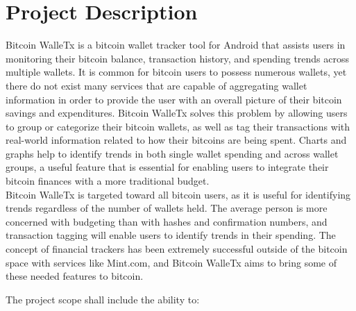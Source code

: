 \documentclass[12pt]{article}
\begin{document}
  \section{Project Description}
  \begin{adjustwidth}{1.5em}{0pt}

  \normalsize{Bitcoin WalleTx is a bitcoin wallet tracker tool for Android that assists users in monitoring their bitcoin balance, transaction history, and spending trends across multiple wallets. It is common for bitcoin users to possess numerous wallets, yet there do not exist many services that are capable of aggregating wallet information in order to provide the user with an overall picture of their bitcoin savings and expenditures. Bitcoin WalleTx solves this problem by allowing users to group or categorize their bitcoin wallets, as well as tag their transactions with real-world information related to how their bitcoins are being spent. Charts and graphs help to identify trends in both single wallet spending and across wallet groups, a useful feature that is essential for enabling users to integrate their bitcoin finances with a more traditional budget.}\\

  \normalsize{Bitcoin WalleTx is targeted toward all bitcoin users, as it is useful for identifying trends regardless of the number of wallets held. The average person is more concerned with budgeting than with hashes and confirmation numbers, and transaction tagging will enable users to identify trends in their spending. The concept of financial trackers has been extremely successful outside of the bitcoin space with services like Mint.com, and Bitcoin WalleTx aims to bring some of these needed features to bitcoin.}\\
  \end{adjustwidth}

  \normalsize{The project scope shall include the ability to:}\\ 
  
\end{document}

